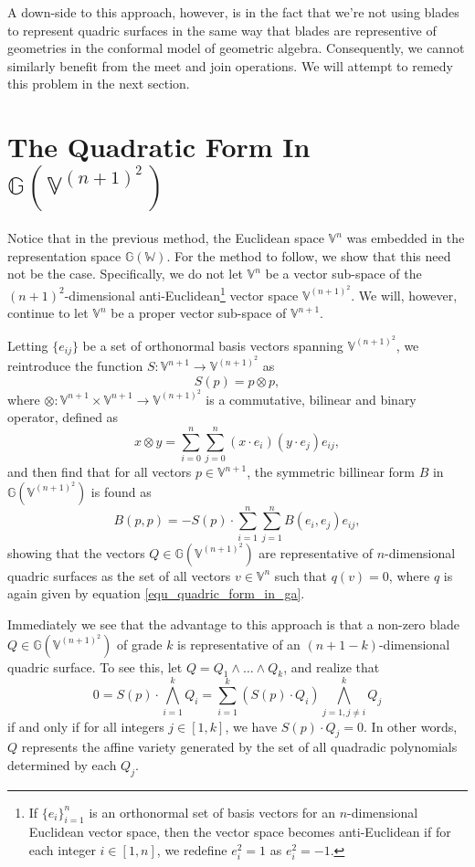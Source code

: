 \documentclass{birkjour}
\theoremstyle{definition}
\theoremstyle{remark}
\numberwithin{equation}{section}
\newcommand{\G}{\mathbb{G}}
\newcommand{\V}{\mathbb{V}}
\newcommand{\W}{\mathbb{W}}
\begin{document}
A down-side to this approach, however, is in the fact that we're not using blades
to represent quadric surfaces in the same way that blades are representive of geometries
in the conformal model of geometric algebra.  Consequently, we cannot similarly benefit
from the meet and join operations.
We will attempt to remedy this problem in the next section.

\section{The Quadratic Form In $\G(\V^{(n+1)^2})$}

Notice that in the previous method, the Euclidean space $\V^n$ was
embedded in the representation space $\G(\W)$.  For the method to
follow, we show that this need not be the case.  Specifically, we
do not let $\V^n$ be a vector sub-space of the $(n+1)^2$-dimensional
anti-Euclidean\footnote{If $\{e_i\}_{i=1}^n$ is an orthonormal set of basis
vectors for an $n$-dimensional Euclidean vector space, then the vector space
becomes anti-Euclidean if for each integer $i\in[1,n]$, we redefine $e_i^2=1$ as $e_i^2=-1$.}
vector space $\V^{(n+1)^2}$.
We will, however, continue to let $\V^n$ be a proper vector sub-space of $\V^{n+1}$.

Letting $\{e_{ij}\}$ be a set
of orthonormal basis vectors spanning $\V^{(n+1)^2}$, we reintroduce the
function $S:\V^{n+1}\to\V^{(n+1)^2}$ as
\begin{equation}
S(p) = p\otimes p,
\end{equation}
where $\otimes:\V^{n+1}\times\V^{n+1}\to\V^{(n+1)^2}$ is a commutative,
bilinear and binary operator, defined as
\begin{equation}
x\otimes y = \sum_{i=0}^n\sum_{j=0}^n(x\cdot e_i)(y\cdot e_j)e_{ij},
\end{equation}
and then find that for all vectors $p\in\V^{n+1}$, the symmetric billinear form
$B$ in $\G(\V^{(n+1)^2})$ is found as
\begin{equation}\label{equ_quadric_intersectable}
B(p,p) = -S(p)\cdot\sum_{i=1}^n\sum_{j=1}^n B(e_i,e_j)e_{ij},
\end{equation}
showing that the vectors $Q\in\G(\V^{(n+1)^2})$ are representative
of $n$-dimensional quadric surfaces as the set of all vectors $v\in\V^n$
such that $q(v)=0$, where $q$ is again given by equation \eqref{equ_quadric_form_in_ga}.

Immediately we see that the advantage to this approach is that a
non-zero blade $Q\in\G(\V^{(n+1)^2})$ of grade $k$ is representative
of an $(n+1-k)$-dimensional quadric surface.  To see this,
let $Q=Q_1\wedge\dots\wedge Q_k$, and realize that
\begin{equation}
0 = S(p)\cdot\bigwedge_{i=1}^k Q_i = \sum_{i=1}^k (S(p)\cdot Q_i)\bigwedge_{j=1,j\neq i}^k Q_j
\end{equation}
if and only if for all integers $j\in[1,k]$, we have $S(p)\cdot Q_j=0$.  In other words,
$Q$ represents the affine variety generated by the set of all quadradic polynomials
determined by each $Q_j$.
\end{document}
